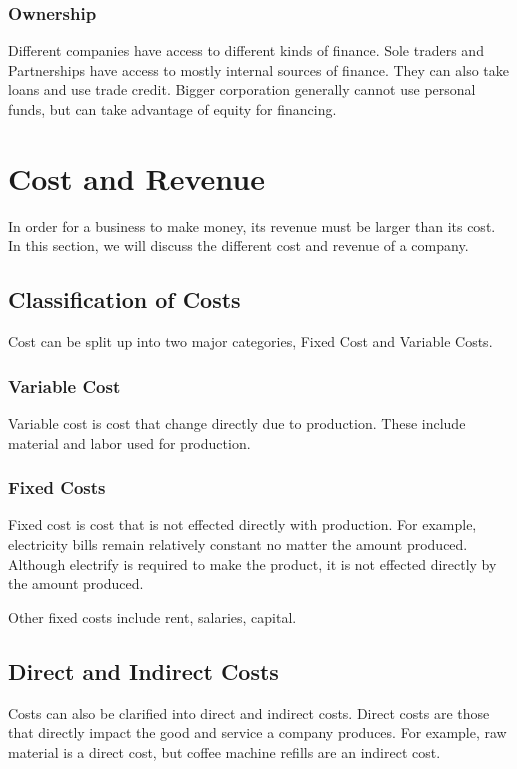 \documentclass{standalone}
\begin{document}
\subsubsection{Ownership}
Different companies have access to different kinds of finance.
Sole traders and Partnerships have access to mostly internal sources of finance.
They can also take loans and use trade credit.
Bigger corporation generally cannot use personal funds, but can take advantage of equity for financing.

\section{Cost and Revenue}
In order for a business to make money, its revenue must be larger than its cost.
In this section, we will discuss the different cost and revenue of a company.

\subsection{Classification of Costs}
Cost can be split up into two major categories, Fixed Cost and Variable Costs.

\subsubsection{Variable Cost}
Variable cost is cost that change directly due to production.
These include material and labor used for production.

\subsubsection{Fixed Costs}
Fixed cost is cost that is not effected directly with production.
For example, electricity bills remain relatively constant no matter the amount produced.
Although electrify is required to make the product, it is not effected directly by the amount produced.

Other fixed costs include rent, salaries, capital.

\subsection{Direct and Indirect Costs}
Costs can also be clarified into direct and indirect costs.
Direct costs are those that directly impact the good and service a company produces.
For example, raw material is a direct cost, but coffee machine refills are an indirect cost.
\end{document}
